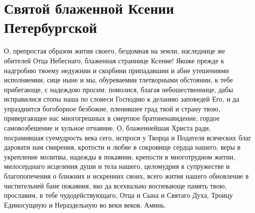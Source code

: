 \section{Святой блаженной Ксении Петербургской}\begin{mymulticols}



О, препростая образом жития своего, бездомная на земли, наследнице же обителей Отца Небеснаго, блаженная страннице Ксение! Якоже прежде к надгробию твоему недужнии и скорбнии припадавшии и абие утешениями исполняемии, сице ныне и мы, обуреваемии тлетворными обстоянии, к тебе прибегающе, с надеждою просим: помолися, благая небошественнице, дабы исправилися стопы наша по словеси Господню к деланию заповедей Его, и да упразднится богоборное безбожие, пленившее град твой и страну твою, привергающее нас многогрешных в смертное братоненавидение, гордое самовозбешение и хульное отчаяние. О, блаженнейшая Христа ради, посрамившая суемудрость века сего, испроси у Творца и Подателя всяческих благ даровати нам смирения, кротости и любве в сокровище сердца нашего, веры в укрепление молитвы, надежды в покаянии, крепости в многотрудном житии, милосерднаго исцеления души и тела нашего, целомудрия в супружестве и благопопечения о ближних и искренних своих, всего жития нашего обновление в чистительней бане покаяния, яко да всехвально воспевающе память твою, прославим, в тебе чудодействующаго, Отца и Сына и Святаго Духа, Троицу Единосущную и Нераздельную во веки веков. Аминь.


\end{mymulticols}

\mychapterending





